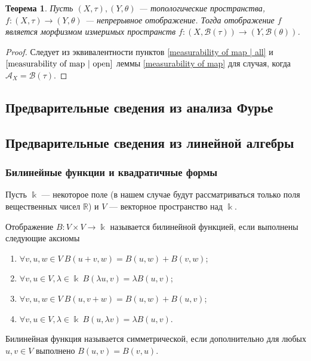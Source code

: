 \documentclass[12pt]{article}
\newtheorem{theorem}{Теорема}
\numberwithin{theorem}{section}
\theoremstyle{definition}
\newcommand{\RR}{\mathbb{R}}
\newcommand{\calA}{\mathcal{A}}
\newcommand{\calB}{\mathcal{B}}
\newcommand{\defin}[2]{\hypertarget{#2}{{\color{red} #1}}}
\begin{document}
	\begin{theorem} \label{borel functor}
		Пусть $ (X, \tau), (Y, \theta) $ --- топологические пространства,
		$ f \colon (X, \tau) \to (Y, \theta) $ --- непрерывное отображение.
		Тогда отображение $ f $ является морфизмом измеримых пространств
		$ f \colon (X, \calB(\tau)) \to (Y, \calB(\theta)) $.
	\end{theorem}
	
	\begin{proof}
		Следует из эквивалентности пунктов \ref{measurability of map | all}
		и $ \ref{measurability of map | open} $ леммы \ref{measurability of map} 
		для случая, когда $ \calA_X = \calB(\tau) $.
	\end{proof}
	
	\subsection{Предварительные сведения из анализа Фурье}
	
	\subsection{Предварительные сведения из линейной алгебры}
	
	\subsubsection{Билинейные функции и квадратичные формы}
	
	Пусть $ \Bbbk $ --- некоторое поле (в нашем случае будут рассматриваться только поля вещественных чисел $ \RR $) и $ V $ --- векторное пространство над $ \Bbbk $.
	
	Отображение $ B \colon V \times V \to \Bbbk $ называется \defin{билинейной функцией}{bilinear}, если выполнены следующие аксиомы
	\begin{enumerate}
		\item $ \forall v,u,w \in V \ B(u + v, w) = B(u, w) + B(v, w) $;
		\item $ \forall v,u \in V, \lambda \in \Bbbk \ B(\lambda u, v) = \lambda B(u, v) $;
		\item $ \forall v,u,w \in V \ B(u, v + w) = B(u, w) + B(u, v) $;
		\item $ \forall v,u \in V, \lambda \in \Bbbk \ B(u, \lambda v) = \lambda B(u, v) $.
	\end{enumerate}
	
	Билинейная функция называется \defin{симметрической}{symmetric}, если дополнительно для любых $ u, v \in V $ выполнено $ B(u, v) = B(v, u) $.
	
\end{document}
